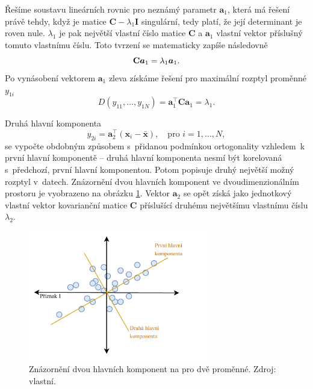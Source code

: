 Řešíme soustavu lineárních rovnic pro neznámý parametr $\bm{a}_1$, která má řešení právě tehdy, když je matice $\mathbf{C} - \lambda_1 \mathbf{I} $ singulární, tedy platí, že její determinant  je roven nule. $\lambda_1$ je pak největší vlastní číslo matice $\mathbf{C}$ a $\bm{a}_1$ vlastní vektor příslušný tomuto vlastnímu číslu. Toto tvrzení se matematicky zapíše následovně
\begin{equation}
    \mathbf{C} \bm{a}_1 = \lambda_1 \bm{a}_1. \\
\end{equation}
Po vynásobení vektorem $\bm{a}_1$ zleva získáme řešení pro maximální rozptyl proměnné $y_{1i}$
\begin{equation}
    D(y_{11}, \ldots, y_{1N}) = \bm{a}_1^\top \mathbf{C} \bm{a}_1 = \lambda_1.
\end{equation}


Druhá hlavní komponenta
\begin{equation}
    y_{2i} = \bm{a}_2^\top (\bm{x}_i - \bar{\bm{x}}), \quad \mbox{pro } i=1,\ldots,N,
\end{equation}
se vypočte obdobným způsobem s~přidanou podmínkou ortogonality vzhledem~k první hlavní komponentě -- druhá hlavní komponenta nesmí být korelovaná s~předchozí, první hlavní komponentou. Potom popisuje druhý největší možný rozptyl v~datech. Znázornění dvou hlavních komponent ve dvoudimenzionálním prostoru je vyobrazeno na obrázku \ref*{obr:met:PCA1}.
Vektor  $\bm{a}_2$ se opět získá jako jednotkový vlastní vektor kovarianční matice $\mathbf{C}$ příslušící druhému největšímu vlastnímu číslu $\lambda_2$.\cite{bib:PCA1, bib:PCA3} %

\begin{figure}[hbtp!]
    \centering
    \includegraphics[width=0.7\textwidth]{obrazky/PCA.pdf}
    \caption{Znázornění dvou hlavních komponent na pro dvě proměnné. Zdroj: vlastní.}
    \label{obr:met:PCA1}
\end{figure}

